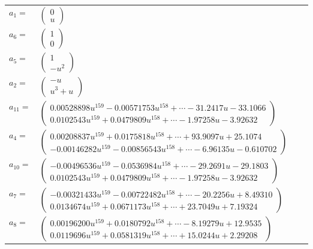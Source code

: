 \documentclass[1p]{elsarticle_modified}
\theoremstyle{definition}
\begin{document}
\begin{tabular}{m{7pt} m{180pt} m{7pt} m{180pt} }
\flushright $a_{1}=$&$\begin{pmatrix}0\\u\end{pmatrix}$ \\
\flushright $a_{6}=$&$\begin{pmatrix}1\\0\end{pmatrix}$ \\
\flushright $a_{5}=$&$\begin{pmatrix}1\\- u^2\end{pmatrix}$ \\
\flushright $a_{2}=$&$\begin{pmatrix}- u\\u^3+u\end{pmatrix}$ \\
\flushright $a_{11}=$&$\begin{pmatrix}0.00528898 u^{159}-0.00571753 u^{158}+\cdots-31.2417 u-33.1066\\0.0102543 u^{159}+0.0479809 u^{158}+\cdots-1.97258 u-3.92632\end{pmatrix}$ \\
\flushright $a_{4}=$&$\begin{pmatrix}0.00208837 u^{159}+0.0175818 u^{158}+\cdots+93.9097 u+25.1074\\-0.00146282 u^{159}-0.00856543 u^{158}+\cdots-6.96135 u-0.610702\end{pmatrix}$ \\
\flushright $a_{10}=$&$\begin{pmatrix}-0.00496536 u^{159}-0.0536984 u^{158}+\cdots-29.2691 u-29.1803\\0.0102543 u^{159}+0.0479809 u^{158}+\cdots-1.97258 u-3.92632\end{pmatrix}$ \\
\flushright $a_{7}=$&$\begin{pmatrix}-0.00321433 u^{159}-0.00722482 u^{158}+\cdots-20.2256 u+8.49310\\0.0134674 u^{159}+0.0671173 u^{158}+\cdots+23.7049 u+7.19324\end{pmatrix}$ \\
\flushright $a_{8}=$&$\begin{pmatrix}0.00196200 u^{159}+0.0180792 u^{158}+\cdots-8.19279 u+12.9535\\0.0119696 u^{159}+0.0581319 u^{158}+\cdots+15.0244 u+2.29208\end{pmatrix}$ \\

\end{tabular}
\end{document}
